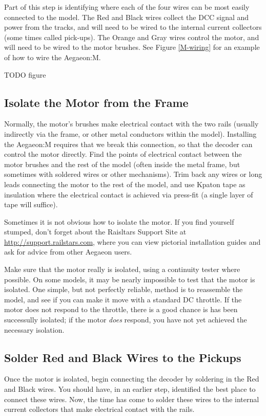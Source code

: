 \documentclass[12pt,letterpaper,draft]{memoir} %
\begin{document}
Part of this step is identifying where each of the four wires can be most easily connected to the model. The Red and Black wires collect the DCC signal and power from the tracks, and will need to be wired to the internal current collectors (some times called pick-ups). The Orange and Gray wires control the motor, and will need to be wired to the motor brushes. See Figure \ref{M-wiring} for an example of how to wire the Aegaeon:M.

TODO figure \label{M-wiring}

\subsection{Isolate the Motor from the Frame}
Normally, the motor's brushes make electrical contact with the two rails (usually indirectly via the frame, or other metal conductors within the model). Installing the Aegaeon:M requires that we break this connection, so that the decoder can control the motor directly. Find the points of electrical contact between the motor brushes and the rest of the model (often inside the metal frame, but sometimes with soldered wires or other mechanisms). Trim back any wires or long leads connecting the motor to the rest of the model, and use Kpaton tape as insulation where the electrical contact is achieved via press-fit (a single layer of tape will suffice).

Sometimes it is not obvious how to isolate the motor. If you find yourself stumped, don't forget about the Raisltars Support Site at \url{http://support.railstars.com}, where you can view pictorial installation guides and ask for advice from other Aegaeon users.

Make sure that the motor really is isolated, using a continuity tester where possible. On some models, it may be nearly impossible to test that the motor is isolated. One simple, but not perfectly reliable, method is to reassemble the model, and see if you can make it move with a standard DC throttle. If the motor does not respond to the throttle, there is a good chance is has been successully isolated; if the motor \textit{does} respond, you have not yet achieved the necessary isolation.

\subsection{Solder Red and Black Wires to the Pickups}
Once the motor is isolated, begin connecting the decoder by soldering in the Red and Black wires. You should have, in an earlier step, identified the best place to connect these wires. Now, the time has come to solder these wires to the internal current collectors that make electrical contact with the rails.
\end{document}
